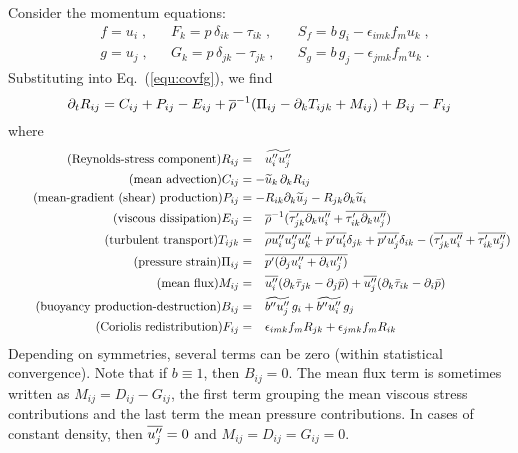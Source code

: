 Consider the momentum equations:
\begin{align}
    &f = u_i\;, && F_k=p\,\delta_{ik}-\tau_{ik}\;, && S_f = b\, g_i- \epsilon_{imk} f_m u_k\;,\\
    &g = u_j\;, && G_k=p\,\delta_{jk}-\tau_{jk}\;, && S_g = b\, g_j- \epsilon_{jmk} f_m u_k\;.
\end{align}
Substituting into Eq.~(\ref{equ:covfg}), we find
\begin{equation}\label{equ:Rij}
    \pt{R_{ij}}{t}  = C_{ij}  +P_{ij} -E_{ij}
    +\avr{\rho}^{-1} ( \Pi_{ij} - \pt{T_{ijk}}{k} + M_{ij} ) +B_{ij} -F_{ij}
\end{equation}
where
\begin{align}
    \tag{Reynolds-stress component}
    R_{ij}  &=\phantom{-}\avf{u_i''u_j''}\\
    \tag{mean advection}
    C_{ij}  &=-\avf{u}_k\,\pt{R_{ij}}{k}\\
    \tag{mean-gradient (shear) production}
    P_{ij}  &=-R_{ik} \pt{\avf{u}_j}{k} -R_{jk} \pt{\avf{u}_i}{k} \\
    \tag{viscous dissipation}
    E_{ij}  &=\phantom{-} \avr{\rho}^{-1} ( \avr{\tau'_{jk} \pt{u''_i}{k}}
    +\avr{\tau'_{ik} \pt{u''_j}{k}} )\\
    \tag{turbulent transport}
    T_{ijk} &=\phantom{-} \avr{\rho u''_i u''_j u''_k}
    +\avr{p'u'_i}\delta_{jk} +\avr{p'u'_j}\delta_{ik}
    -( \avr{\tau'_{jk} u''_i} +\avr{\tau'_{ik} u''_j} )\\
    \tag{pressure strain}
    \Pi_{ij}&=\phantom{-} \avr{ p' ( \pt{u''_i}{j}+ \pt{u''_j}{i} ) }\\
    \tag{mean flux}
    M_{ij}  &=\phantom{-} \avr{u''_i} ( \pt{\bar{\tau}_{jk}}{k} - \pt{\bar{p}}{j} )
    +\avr{u''_j} ( \pt{\bar{\tau}_{ik}}{k} - \pt{\bar{p}}{i} )\\
    \tag{buoyancy production-destruction}
    B_{ij}  &=\phantom{-} \avf{b''u''_j}\,g_i+\avf{b''u''_i}\,g_j \\
    \tag{Coriolis redistribution}
    F_{ij}  &=\phantom{-} \epsilon_{imk}f_m R_{jk} +\epsilon_{jmk}f_m R_{ik}
\end{align}
Depending on symmetries, several terms can be zero (within statistical convergence). Note that if $b\equiv 1$, then $B_{ij}=0$. The mean flux term is sometimes written as $M_{ij}=D_{ij}-G_{ij}$, the first term grouping the mean viscous stress contributions and the last term the mean pressure contributions. In cases of constant density, then $\avr{u''_j}=0$ and $M_{ij}=D_{ij}=G_{ij}=0$.

